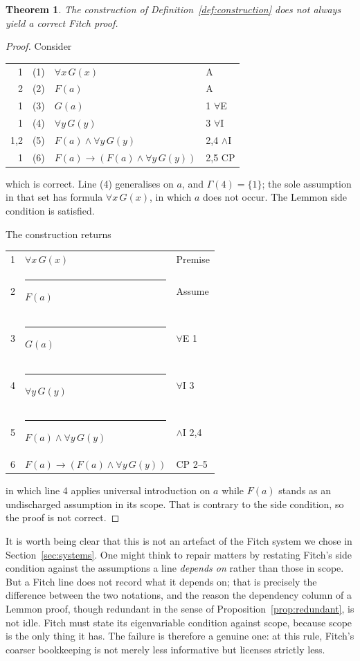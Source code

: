 \documentclass[11pt]{article}
\makeatletter
\theoremstyle{plain}
\newtheorem{theorem}{Theorem}
\theoremstyle{definition}
\theoremstyle{remark}
\newcommand{\fbar}{\rule[-0.7ex]{0.4pt}{2.6ex}\hspace{0.7em}}
\newcommand{\dep}[1]{\textup{#1}}
\newenvironment{lemmonproof}
  {\begin{center}\begin{tabular}{@{}r@{\hspace{1.5em}}r@{\hspace{0.6em}}l@{\hspace{2.5em}}l@{}}}
  {\end{tabular}\end{center}}
\newenvironment{fitchproof}
  {\begin{center}\begin{tabular}{@{}r@{\hspace{1em}}l@{\hspace{2.5em}}l@{}}}
  {\end{tabular}\end{center}}
\makeatother
\begin{document}
\begin{theorem}\label{thm:refuted}
The construction of Definition~\ref{def:construction} does not always yield a
correct Fitch proof.
\end{theorem}

\begin{proof}
Consider

\begin{lemmonproof}
\dep{1}   & (1) & $\forall x\, G(x)$ & A \\
\dep{2}   & (2) & $F(a)$             & A \\
\dep{1}   & (3) & $G(a)$             & 1 $\forall$E \\
\dep{1}   & (4) & $\forall y\, G(y)$ & 3 $\forall$I \\
\dep{1,2} & (5) & $F(a) \wedge \forall y\, G(y)$ & 2,4 $\wedge$I \\
\dep{1}   & (6) & $F(a) \to (F(a) \wedge \forall y\, G(y))$ & 2,5 CP \\
\end{lemmonproof}

\noindent which is correct. Line (4) generalises on $a$, and $\Gamma(4) =
\{1\}$; the sole assumption in that set has formula $\forall x\, G(x)$, in
which $a$ does not occur. The Lemmon side condition is satisfied.

The construction returns

\begin{fitchproof}
1 &                 $\forall x\, G(x)$ & Premise \\
2 & \fbar           $F(a)$             & Assume \\
3 & \fbar           $G(a)$             & $\forall$E 1 \\
4 & \fbar           $\forall y\, G(y)$ & $\forall$I 3 \\
5 & \fbar           $F(a) \wedge \forall y\, G(y)$ & $\wedge$I 2,4 \\
6 &                 $F(a) \to (F(a) \wedge \forall y\, G(y))$ & CP 2--5 \\
\end{fitchproof}

\noindent in which line 4 applies universal introduction on $a$ while $F(a)$
stands as an undischarged assumption in its scope. That is contrary to the
side condition, so the proof is not correct.
\end{proof}

It is worth being clear that this is not an artefact of the Fitch system we
chose in Section~\ref{sec:systems}. One might think to repair matters by
restating Fitch's side condition against the assumptions a line
\emph{depends on} rather than those in scope. But a Fitch line does not
record what it depends on; that is precisely the difference between the two
notations, and the reason the dependency column of a Lemmon proof, though
redundant in the sense of Proposition~\ref{prop:redundant}, is not idle.
Fitch must state its eigenvariable condition against scope, because scope is
the only thing it has. The failure is therefore a genuine one: at this rule,
Fitch's coarser bookkeeping is not merely less informative but licenses
strictly less.
\end{document}
